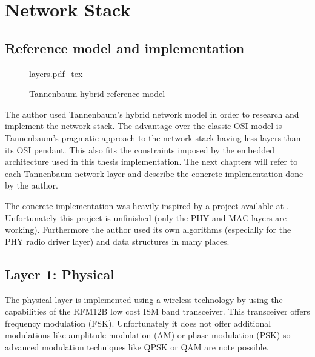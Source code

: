 \chapter{Network Stack}%
\section{Reference model and implementation}%
\begin{figure}[H]
    \centering
    {layers.pdf_tex}
    \caption{Tannenbaum hybrid reference model \cite{tannenbaum}}
    \label{fig:tannenbaum_model}
\end{figure}

The author used Tannenbaum's hybrid network model \cite{tannenbaum} in order to research and implement the network stack. The advantage over the classic OSI model is Tannenbaum's pragmatic approach to the network stack having less layers than its OSI pendant. This also fits the constraints imposed by the embedded architecture used in this thesis implementation. The next chapters will refer to each Tannenbaum network layer and describe the concrete implementation done by the author.

The concrete implementation was heavily inspired by a project available at \cite{stahl}. Unfortunately this project is unfinished (only the PHY and MAC layers are working). Furthermore the author used its own algorithms (especially for the PHY radio driver layer) and data structures in many places.

\section{Layer 1: Physical}%
The physical layer is implemented using a wireless technology by using the capabilities of the RFM12B low cost ISM band transceiver. This transceiver offers frequency modulation (FSK). Unfortunately it does not offer additional modulations like amplitude modulation (AM) or phase modulation (PSK) so advanced modulation techniques like QPSK or QAM are note possible. 

